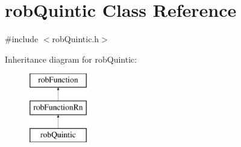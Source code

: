 \hypertarget{classrob_quintic}{}\section{rob\+Quintic Class Reference}
\label{classrob_quintic}


{\ttfamily \#include $<$rob\+Quintic.\+h$>$}

Inheritance diagram for rob\+Quintic\+:\begin{figure}[H]
\begin{center}
\leavevmode
\includegraphics[height=3.000000cm]{da/da2/classrob_quintic}
\end{center}
\end{figure}
